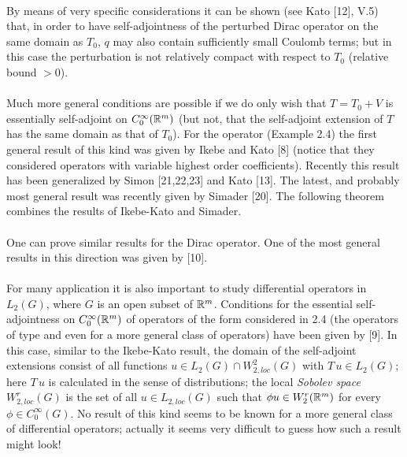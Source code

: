 \documentclass[11pt,twoside]{article}
\begin{document}
\paragraph*{}
By means of very specific considerations it can be shown
(see Kato [12], V.5) that,
in order to have self-adjointness of the perturbed Dirac operator
on the same domain as $T_0$,
$q$ may also contain sufficiently small Coulomb terms;
but in this case the perturbation is not relatively compact with respect to $T_0$
(relative bound $> 0$).

\paragraph*{}
Much more general conditions are possible
if we do only wish that $T = T_0 + V$ is essentially self-adjoint
on $C_0^{\infty}({\mathbb{R}}^m)$
(but not,
that the self-adjoint extension of $T$ has the same domain as that of $T_0$).
For the {\SCHROEDINGER} operator (Example 2.4) the first general result
of this kind was given by Ikebe and Kato [8]
(notice that they considered operators with variable highest order coefficients).
Recently this result has been generalized by Simon [21,22,23] and Kato [13].
The latest, and probably most general result was recently given by Simader [20].
The following theorem combines the results of Ikebe-Kato and Simader.


\paragraph*{}
One can prove similar results for the Dirac operator.
One of the most general results in this direction was given by {\JOERGENS} [10].


\paragraph*{}
For many application it is also important to study differential operators
in $L_2(G)$, where $G$ is an open subset of ${\mathbb{R}}^m$.
Conditions for the essential self-adjointness on $C_0^{\infty}({\mathbb{R}}^m)$
of operators of the form considered in 2.4 (the operators of {\SCHROEDINGER} type
and even for a more general class of operators) have been given
by {\JOERGENS} [9].
In this case,
similar to the Ikebe-Kato result,
the domain of the self-adjoint extensions consist of all functions
$u \in L_2(G) \cap W_{2,loc}^2(G)$ with $T\,u \in L_2(G)$;
here $T\,u$ is calculated in the sense of distributions;
the local \textit{Sobolev space} $W_{2,loc}^r(G)$
is the set of all $u \in L_{2,loc}(G)$
such that $\phi u \in W_2^r({\mathbb{R}}^m)$ for every $\phi \in C_0^{\infty}(G)$.
No result of this kind seems to be known for a more general class of differential
operators; actually it seems very difficult to guess how such a result might look!
\end{document}
